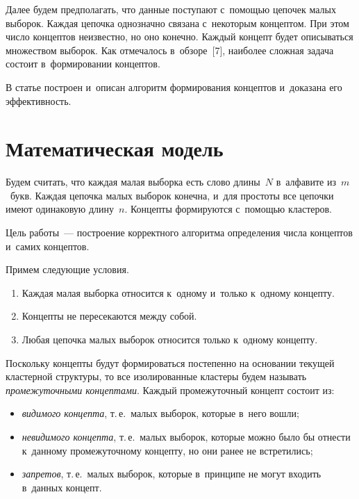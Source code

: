 \begin{multicols}{2}
  Далее будем предполагать, что данные поступают с~помощью цепочек малых 
выборок. Каждая цепочка однозначно связана с~некоторым кон\-цеп\-том. При этом 
чис\-ло кон\-цеп\-тов неизвестно, но оно конечно. Каждый концепт будет описываться 
множеством выборок. Как отмечалось в~обзоре~[7], наиболее сложная задача 
состоит в~формировании концептов. 
  
  В статье построен и~описан алгоритм формирования концептов и~доказана его 
эффективность.

\vspace*{-6pt}
  
  \section{Математическая модель}
  
  \vspace*{-2pt}
  
  Будем считать, что каждая малая выборка есть слово длины~$N$ в~алфавите 
из~$m$~букв. Каждая цепочка малых выборок конечна, и~для простоты все 
цепочки имеют одинаковую длину~$n$. Концепты формируются с~помощью 
кластеров. 
  
  Цель работы~--- построение корректного алгоритма определения числа 
концептов и~самих концептов. 
  
  Примем следующие условия.\\[-14pt]
  \begin{enumerate}[1.]
\item Каждая малая выборка относится к~одному и~только к~одному концепту.\\[-14pt]
\item Концепты не пересекаются между собой.\\[-14pt]
\item Любая цепочка малых выборок относится только к~одному концепту.\\[-14pt]
  \end{enumerate}
  
  Поскольку концепты будут формироваться постепенно на основании текущей 
кластерной структуры, то все изолированные кластеры будем называть 
\textit{промежуточными концептами}. Каждый промежуточный концепт состоит из:\\[-14pt]
  \begin{itemize}
\item \textit{видимого концепта}, т.\,е.\ малых выборок, которые в~него 
вошли;\\[-14pt] 
\item \textit{невидимого концепта}, т.\,е.\ малых выборок, которые можно было 
бы отнести к~данному промежуточному концепту, но они ранее не встретились;\\[-14pt] 
\item \textit{запретов}, т.\,е.\ малых выборок, которые в~принципе не могут 
входить в~данных концепт.\\[-14pt]
\end{itemize}


\end{multicols}
